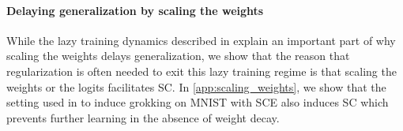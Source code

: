 \paragraph{Delaying generalization by scaling the weights}
While the lazy training dynamics described in \cite{Kumar2023-hz} explain an important part of why scaling the weights delays generalization, we show that the reason that regularization is often needed to exit this lazy training regime is that scaling the weights or the logits facilitates SC.  In \cref{app:scaling_weights}, we show that the setting used in \cite{liu2023grokking} to induce grokking on MNIST with SCE also induces SC which prevents further learning in the absence of weight decay.